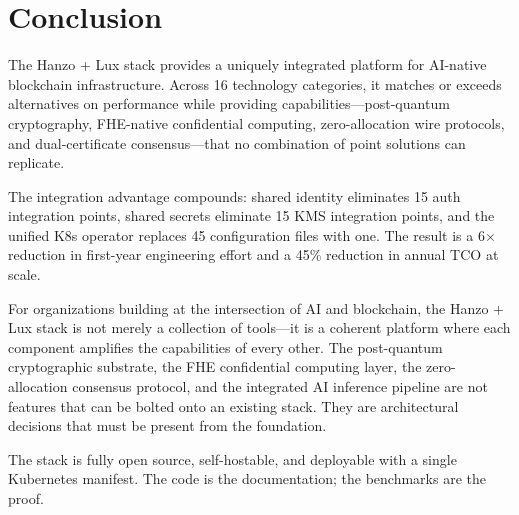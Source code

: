 \section{Conclusion}

\label{sec:conclusion}

The Hanzo + Lux stack provides a uniquely integrated platform for AI-native blockchain infrastructure. Across 16 technology categories, it matches or exceeds alternatives on performance while providing capabilities---post-quantum cryptography, FHE-native confidential computing, zero-allocation wire protocols, and dual-certificate consensus---that no combination of point solutions can replicate.

The integration advantage compounds: shared identity eliminates 15 auth integration points, shared secrets eliminate 15 KMS integration points, and the unified K8s operator replaces 45 configuration files with one. The result is a 6$\times$ reduction in first-year engineering effort and a 45\% reduction in annual TCO at scale.

For organizations building at the intersection of AI and blockchain, the Hanzo + Lux stack is not merely a collection of tools---it is a coherent platform where each component amplifies the capabilities of every other. The post-quantum cryptographic substrate, the FHE confidential computing layer, the zero-allocation consensus protocol, and the integrated AI inference pipeline are not features that can be bolted onto an existing stack. They are architectural decisions that must be present from the foundation.

The stack is fully open source, self-hostable, and deployable with a single Kubernetes manifest. The code is the documentation; the benchmarks are the proof.


